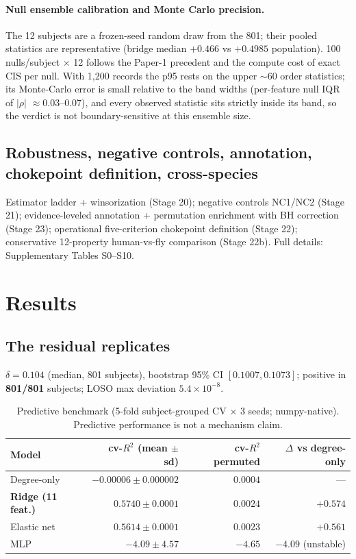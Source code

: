 \documentclass[11pt,a4paper]{article}
\newcommand{\del}{\delta}
\begin{document}
\paragraph{Null ensemble calibration and Monte Carlo precision.}
The 12 subjects are a frozen-seed random draw from the 801; their pooled
statistics are representative (bridge median $+0.466$ vs $+0.4985$
population). 100 nulls/subject $\times$ 12 follows the Paper-1 precedent
and the compute cost of exact CIS per null. With 1{,}200 records the p95
rests on the upper $\sim$60 order statistics; its Monte-Carlo error is
small relative to the band widths (per-feature null IQR of $|\rho|$
$\approx 0.03$--$0.07$), and every observed statistic sits strictly inside
its band, so the verdict is not boundary-sensitive at this ensemble size.

\subsection{Robustness, negative controls, annotation, chokepoint
definition, cross-species}
Estimator ladder + winsorization (Stage 20); negative controls NC1/NC2
(Stage 21); evidence-leveled annotation + permutation enrichment with BH
correction \cite{benjamini1995} (Stage 23); operational five-criterion
chokepoint definition (Stage 22); conservative 12-property human-vs-fly
comparison (Stage 22b). Full details: Supplementary Tables S0--S10.

\section{Results}
\subsection{The residual replicates}
$\del=0.104$ (median, 801 subjects), bootstrap 95\% CI $[0.1007,0.1073]$;
positive in \textbf{801/801} subjects; LOSO max deviation $5.4\times10^{-8}$.

\begin{table}[ht]
\centering\small
\caption{Predictive benchmark (5-fold subject-grouped CV $\times$ 3 seeds;
numpy-native). Predictive performance is not a mechanism claim.}
\begin{tabular}{lrrr}
\toprule
Model & cv-$R^2$ (mean $\pm$ sd) & cv-$R^2$ permuted & $\Delta$ vs degree-only \\
\midrule
Degree-only & $-0.00006\pm0.000002$ & $0.0004$ & --- \\
\textbf{Ridge (11 feat.)} & $\mathbf{0.5740\pm0.0001}$ & $0.0024$ & $\mathbf{+0.574}$ \\
Elastic net & $0.5614\pm0.0001$ & $0.0023$ & $+0.561$ \\
MLP & $-4.09\pm4.57$ & $-4.65$ & $-4.09$ (unstable) \\
\bottomrule
\end{tabular}
\end{table}
\end{document}
